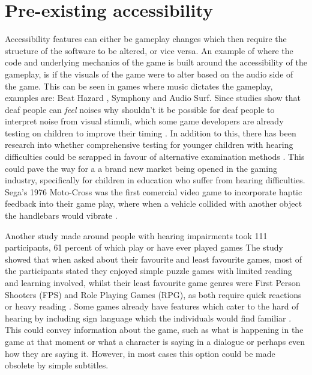 \documentclass{scrartcl}
\begin{document}
\section{Pre-existing accessibility}
Accessibility features can either be gameplay changes which then require the structure of the software to be altered, or vice versa. An example of where the code and underlying mechanics of the game is built around the accessibility of the gameplay, is if the visuals of the game were to alter based on the audio side of the game. This can be seen in games where music dictates the gameplay, examples are: Beat Hazard \cite {game:beathazard}, Symphony\cite {game:symphony} and Audio Surf\cite {game:audiosurf}. Since studies show that deaf people can \textit{feel} noises \cite {Nanayakkara} why shouldn't it be possible for deaf people to interpret noise from visual stimuli, which some game developers are already testing on children to improve their timing  \cite {Jouhtimaki}. In addition to this, there has been research into whether comprehensive testing for younger children with hearing difficulties could be scrapped in favour of alternative examination methods \cite{Mich}. This could pave the way for a a brand new market being opened in the gaming industry, specifically for children in education who suffer from hearing difficulties. Sega's 1976 Moto-Cross was the first comercial video game to incorporate haptic feedback into their game play, where when a vehicle collided with another object the handlebars would vibrate \cite {Sega}. 

 Another study made around people with hearing impairments took 111 participants, 61 percent of which play or have ever played games\cite {Coutinho} The study showed that when asked about their favourite and least favourite games, most of the participants stated they enjoyed simple puzzle games with limited reading and learning involved, whilst their least favourite game genres were First Person Shooters (FPS) and Role Playing Games (RPG), as both require quick reactions or heavy reading \cite {Coutinho}. Some games already have features which cater to the hard of hearing by including sign language which the individuals would find familiar \cite{Bouzid}. This could convey information about the game, such as what is happening in the game at that moment or what a character is saying in a dialogue or perhaps even how they are saying it. However, in most cases this option could be made obsolete by simple subtitles.
\end{document}
